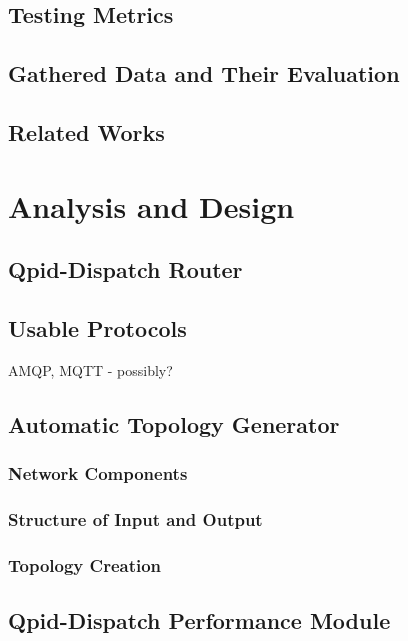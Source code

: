 \section{Testing Metrics}

\section{Gathered Data and Their Evaluation}

\section{Related Works}

\chapter{Analysis and Design}

\section{Qpid-Dispatch Router}

\section{Usable Protocols}
AMQP, MQTT - possibly?

\section{Automatic Topology Generator}

\subsection{Network Components}

\subsection{Structure of Input and Output}

\subsection{Topology Creation}

\section{Qpid-Dispatch Performance Module}

